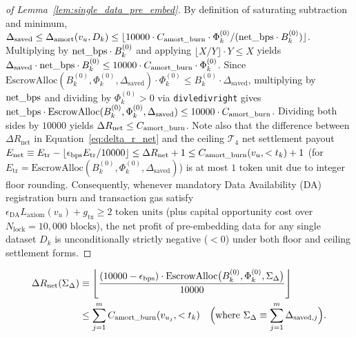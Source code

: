 \documentclass[runningheads,a4paper]{llncs}
\renewcommand{\_}{\textunderscore\allowbreak}
\begin{document}
\begin{proof}[of Lemma~\ref{lem:single_data_pre_embed}]
By definition of saturating subtraction and minimum, $\Delta_{\text{saved}} \le \Delta_{\text{amort}}(v_u,\allowbreak D_k) \le \lfloor 10000 \cdot C_{\text{amort\_burn}} \cdot \Phi_k^{(0)} / (\text{net\_bps} \cdot B_k^{(0)}) \rfloor$. Multiplying by $\text{net\_bps} \cdot B_k^{(0)}$ and applying $\lfloor X / Y \rfloor \cdot Y \le X$ yields $\Delta_{\text{saved}} \cdot \text{net\_bps} \cdot B_k^{(0)} \le 10000 \cdot C_{\text{amort\_burn}} \cdot \Phi_k^{(0)}$. Since $\text{EscrowAlloc}(B_k^{(0)},\allowbreak \Phi_k^{(0)},\allowbreak \Delta_{\text{saved}}) \cdot \Phi_k^{(0)} \le B_k^{(0)} \cdot \Delta_{\text{saved}}$, multiplying by $\text{net\_bps}$ and dividing by $\Phi_k^{(0)} > 0$ via \texttt{div\_le\_div\_right} gives $\text{net\_bps} \cdot \text{EscrowAlloc}(B_k^{(0)},\allowbreak \Phi_k^{(0)},\allowbreak \Delta_{\text{saved}}) \le 10000 \cdot C_{\text{amort\_burn}}$. Dividing both sides by $10000$ yields $\Delta R_{\text{net}} \le C_{\text{amort\_burn}}$. Note also that the difference between $\Delta R_{\text{net}}$ in Equation~\eqref{eq:delta_r_net} and the ceiling $\mathcal{T}_4$ net settlement payout $E_{\text{net}} \equiv E_{\text{tr}} - \lfloor \epsilon_{\text{bps}} E_{\text{tr}} / 10000 \rfloor \le \Delta R_{\text{net}} + 1 \le C_{\text{amort\_burn}}(v_u,\allowbreak < t_k) + 1$ (for $E_{\text{tr}} = \text{EscrowAlloc}(B_k^{(0)},\allowbreak \Phi_k^{(0)},\allowbreak \Delta_{\text{saved}})$) is at most $1\text{ token unit}$ due to integer floor rounding. Consequently, whenever mandatory Data Availability (DA) registration burn and transaction gas satisfy $\epsilon_{\text{DA}} L_{\text{axiom}}(v_u) + g_{\text{tx}} \ge 2\text{ token units}$ (plus capital opportunity cost over $N_{\text{lock}} = 10,000\text{ blocks}$), the net profit of pre-embedding data for any single dataset $D_k$ is unconditionally strictly negative ($< 0$) under both floor and ceiling settlement forms.
\end{proof}


\begin{equation}
\label{eq:multi_pre_embed}
\begin{aligned}
\Delta R_{\text{net}}(\Sigma_\Delta) &\equiv \left\lfloor \frac{(10000 - \epsilon_{\text{bps}}) \cdot \text{EscrowAlloc}\big(B_k^{(0)}, \Phi_k^{(0)}, \Sigma_\Delta\big)}{10000} \right\rfloor \\
&\le \sum_{j=1}^m C_{\text{amort\_burn}}(v_{u_j}, < t_k) \quad \Big(\text{where } \Sigma_\Delta \equiv \sum_{j=1}^m \Delta_{\text{saved},j}\Big).
\end{aligned}
\end{equation}
\end{document}
